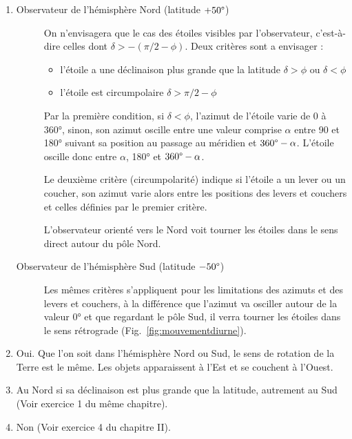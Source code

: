 \documentclass[a4paper,10pt]{report}
\renewcommand{\deg}{\ensuremath{\degree}}
\begin{document}
\begin{Answer}
  \begin{enumerate}
  \item
    \begin{description}
    \item[Observateur de l'hémisphère Nord (latitude $+50\deg$)] On
      n'envisagera que le cas des étoiles visibles par l'observateur,
      c'est-à-dire celles dont $\delta > -(\pi/2 - \phi)$. Deux
      critères sont a envisager :
      \begin{itemize}
      \item l'étoile a une déclinaison plus grande que la latitude
        $\delta>\phi$ ou $\delta<\phi$
      \item l'étoile est circumpolaire $\delta > \pi/2 - \phi$
      \end{itemize}
      Par la première condition, si $\delta<\phi$, l'azimut de
      l'étoile varie de 0 à 360°, sinon, son azimut oscille entre une
      valeur comprise $\alpha$ entre 90 et 180° suivant sa position au
      passage au méridien et $360\deg-\alpha$. L'étoile oscille donc
      entre $\alpha$, 180° et $360\deg-\alpha$.

      Le deuxième critère (circumpolarité) indique si l'étoile a un
      lever ou un coucher, son azimut varie alors entre les positions
      des levers et couchers et celles définies par le premier
      critère.

      L'observateur orienté vers le Nord voit tourner les étoiles dans
      le sens direct autour du pôle Nord.

    \item[Observateur de l'hémisphère Sud (latitude $-50\deg$)] Les
      mêmes critères s'appliquent pour les limitations des azimuts et
      des levers et couchers, à la différence que l'azimut va osciller
      autour de la valeur 0° et que regardant le pôle Sud, il verra
      tourner les étoiles dans le sens rétrograde
      (Fig.~\ref{fig:mouvementdiurne}).
    \end{description}
  \item Oui. Que l'on soit dans l'hémisphère Nord ou Sud, le sens de
    rotation de la Terre est le même. Les objets apparaissent à l'Est
    et se couchent à l'Ouest.

  \item Au Nord si sa déclinaison est plus grande que la latitude,
    autrement au Sud (Voir exercice 1 du même chapitre).

  \item Non (Voir exercice 4 du chapitre II).
  \end{enumerate}
\end{Answer}
\end{document}
